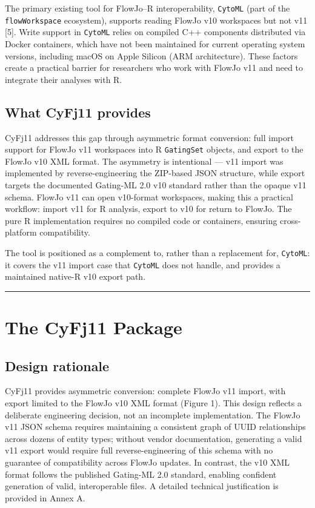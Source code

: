 \documentclass[
]{article}
\begin{document}
The primary existing tool for FlowJo--R interoperability,
\texttt{CytoML} (part of the \texttt{flowWorkspace} ecosystem), supports
reading FlowJo v10 workspaces but not v11 {[}5{]}. Write support in
\texttt{CytoML} relies on compiled C++ components distributed via Docker
containers, which have not been maintained for current operating system
versions, including macOS on Apple Silicon (ARM architecture). These
factors create a practical barrier for researchers who work with FlowJo
v11 and need to integrate their analyses with R.

\subsection{What CyFj11 provides}\label{what-cyfj11-provides}

CyFj11 addresses this gap through asymmetric format conversion: full
import support for FlowJo v11 workspaces into R \texttt{GatingSet}
objects, and export to the FlowJo v10 XML format. The asymmetry is
intentional --- v11 import was implemented by reverse-engineering the
ZIP-based JSON structure, while export targets the documented Gating-ML
2.0 v10 standard rather than the opaque v11 schema. FlowJo v11 can open
v10-format workspaces, making this a practical workflow: import v11 for
R analysis, export to v10 for return to FlowJo. The pure R
implementation requires no compiled code or containers, ensuring
cross-platform compatibility.

The tool is positioned as a complement to, rather than a replacement
for, \texttt{CytoML}: it covers the v11 import case that \texttt{CytoML}
does not handle, and provides a maintained native-R v10 export path.

\begin{center}\rule{0.5\linewidth}{0.5pt}\end{center}

\section{The CyFj11 Package}\label{the-cyfj11-package}

\subsection{Design rationale}\label{design-rationale}

CyFj11 provides asymmetric conversion: complete FlowJo v11 import, with
export limited to the FlowJo v10 XML format (Figure 1). This design
reflects a deliberate engineering decision, not an incomplete
implementation. The FlowJo v11 JSON schema requires maintaining a
consistent graph of UUID relationships across dozens of entity types;
without vendor documentation, generating a valid v11 export would
require full reverse-engineering of this schema with no guarantee of
compatibility across FlowJo updates. In contrast, the v10 XML format
follows the published Gating-ML 2.0 standard, enabling confident
generation of valid, interoperable files. A detailed technical
justification is provided in Annex A.
\end{document}
